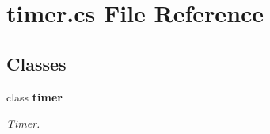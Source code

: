 \section{timer.\+cs File Reference}
\label{timer_8cs}
\subsection*{Classes}
\begin{DoxyCompactItemize}
\item 
class {\bf timer}
\begin{DoxyCompactList}\small\item\em Timer. \end{DoxyCompactList}\end{DoxyCompactItemize}
